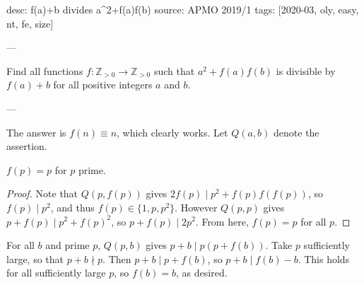 desc: f(a)+b divides a^2+f(a)f(b)
source: APMO 2019/1
tags: [2020-03, oly, easy, nt, fe, size]

---

Find all functions $f:\mathbb Z_{>0}\to\mathbb Z_{>0}$ such that $a^2+f(a)f(b)$ is divisible by $f(a)+b$ for all positive integers $a$ and $b$.

---

The answer is $f(n)\equiv n$, which clearly works. Let $Q(a,b)$ denote the assertion.
\begin{claim*}
    $f(p)=p$ for $p$ prime.
\end{claim*}
\begin{proof}
    Note that $Q(p,f(p))$ gives $2f(p)\mid p^2+f(p)f(f(p))$, so $f(p)\mid p^2$, and thus $f(p)\in\{1,p,p^2\}$. However $Q(p,p)$ gives $p+f(p)\mid p^2+f(p)^2$, so $p+f(p)\mid2p^2$. From here, $f(p)=p$ for all $p$.
\end{proof}

For all $b$ and prime $p$, $Q(p,b)$ gives $p+b\mid p(p+f(b))$. Take $p$ sufficiently large, so that $p+b\nmid p$. Then $p+b\mid p+f(b)$, so $p+b\mid f(b)-b$. This holds for all sufficiently large $p$, so $f(b)=b$, as desired.

